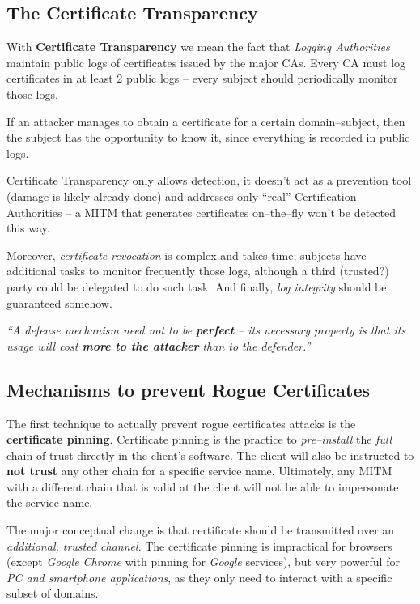 \documentclass[10pt]{extbook}
\begin{document}
\subsection{The Certificate Transparency}

With \textbf{Certificate Transparency} we mean the fact that \emph{Logging
Authorities} maintain public logs of certificates issued by the major CAs.
Every CA must log certificates in at least 2 public logs -- every subject
should periodically monitor those logs.

If an attacker manages to obtain a certificate for a certain domain\---subject,
then the subject has the opportunity to know it, since everything is recorded
in public logs.

Certificate Transparency only allows detection, it doesn't act as a prevention
tool (damage is likely already done) and addresses only ``real'' Certification
Authorities -- a MITM that generates certificates on--the--fly won't be
detected this way.

Moreover, \emph{certificate revocation} is complex and takes time; subjects
have additional tasks to monitor frequently those logs, although a third
(trusted?) party could be delegated to do such task. And finally, \emph{log
integrity} should be guaranteed somehow.

\vspace*{1cm}
\begin{center}
    \emph{``A defense mechanism need not to be \textbf{perfect} -- its necessary
    property is that its usage will cost \textbf{more to the attacker} than to
the defender.''}
\end{center}
\vspace*{1cm}

\subsection{Mechanisms to prevent Rogue Certificates}

The first technique to actually prevent rogue certificates attacks is the
\textbf{certificate pinning}. Certificate pinning is the practice to
\emph{pre--install} the \emph{full} chain of trust directly in the client's
software. The client will also be instructed to \textbf{not trust} any other
chain for a specific service name. Ultimately, any MITM with a different chain
that is valid at the client will not be able to impersonate the service name.

The major conceptual change is that certificate should be transmitted over an
\emph{additional, trusted channel}. The certificate pinning is impractical for
browsers (except \emph{Google Chrome} with pinning for \emph{Google} services),
but very powerful for \emph{PC and smartphone applications}, as they only need
to interact with a specific subset of domains.
\end{document}
